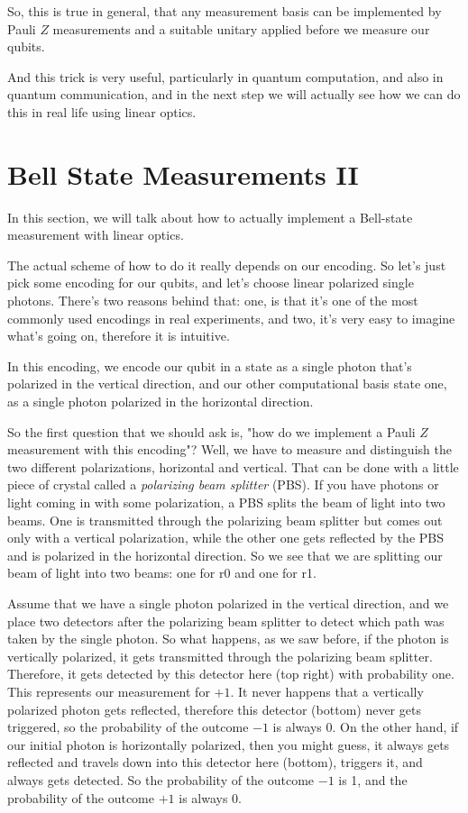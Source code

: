 So, this is true in general, that any measurement basis can be implemented by Pauli $Z$ measurements and a suitable unitary applied before we measure our qubits.

And this trick is very useful, particularly in quantum computation, and also in quantum communication, and in the next step we will actually see how we can do this in real life using linear optics.



\section{Bell State Measurements II}
\label{sec:13-3_Bell_state_measurement_2}

In this section, we will talk about how to actually implement a Bell-state measurement with linear optics.

The actual scheme of how to do it really depends on our encoding. So let's just pick some encoding for our qubits, and let's choose linear polarized single photons. There's two reasons behind that: one, is that it's one of the most commonly used encodings in real experiments, and two, it's very easy to imagine what's going on, therefore it is intuitive.

In this encoding, we encode our qubit in a state  as a single photon that's polarized in the vertical direction, and our other computational basis state one, as a single photon polarized in the horizontal direction.

So the first question that we should ask is, "how do we implement a Pauli $Z$ measurement with this encoding"? Well, we have to measure and distinguish the two different polarizations, horizontal and vertical. That can be done with a little piece of crystal called a \emph{polarizing beam splitter} (PBS). If you have photons or light coming in with some polarization, a PBS splits the beam of light into two beams. One is transmitted through the polarizing beam splitter but comes out only with a vertical polarization, while the other one gets reflected by the PBS and is polarized in the horizontal direction. So we see that we are splitting our beam of light into two beams: one for r0 and one for r1.

Assume that we have a single photon polarized in the vertical direction, and we place two detectors after the polarizing beam splitter to detect which path was taken by the single photon. So what happens, as we saw before, if the photon is vertically polarized, it gets transmitted through the polarizing beam splitter. Therefore, it gets detected by this detector here (top right) with probability one. This represents our measurement for $+1$. It never happens that a vertically polarized photon gets reflected, therefore this detector (bottom) never gets triggered, so the probability of the outcome $-1$ is always 0. On the other hand, if our initial photon is horizontally polarized, then you might guess, it always gets reflected and travels down into this detector here (bottom), triggers it, and always gets detected. So the probability of the outcome $-1$ is 1, and the probability of the outcome $+1$ is always 0.

